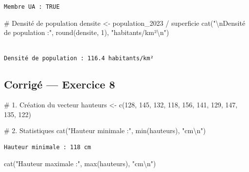 \documentclass[
  french,
  11pt,
  a4paper,
]{article}
\newenvironment{Shaded}{}{}
\newcommand{\CommentTok}[1]{\textcolor[rgb]{0.42,0.45,0.49}{#1}}
\newcommand{\DecValTok}[1]{\textcolor[rgb]{0.00,0.36,0.77}{#1}}
\newcommand{\FunctionTok}[1]{\textcolor[rgb]{0.44,0.26,0.76}{#1}}
\newcommand{\NormalTok}[1]{\textcolor[rgb]{0.14,0.16,0.18}{#1}}
\newcommand{\OtherTok}[1]{\textcolor[rgb]{0.44,0.26,0.76}{#1}}
\newcommand{\SpecialCharTok}[1]{\textcolor[rgb]{0.00,0.36,0.77}{#1}}
\newcommand{\StringTok}[1]{\textcolor[rgb]{0.01,0.18,0.38}{#1}}
\begin{document}
\begin{verbatim}
Membre UA : TRUE 
\end{verbatim}

\begin{Shaded}
\begin{Highlighting}[]
\CommentTok{\# Densité de population}
\NormalTok{densite }\OtherTok{\textless{}{-}}\NormalTok{ population\_2023 }\SpecialCharTok{/}\NormalTok{ superficie}
\FunctionTok{cat}\NormalTok{(}\StringTok{"}\SpecialCharTok{\textbackslash{}n}\StringTok{Densité de population :"}\NormalTok{, }\FunctionTok{round}\NormalTok{(densite, }\DecValTok{1}\NormalTok{), }\StringTok{"habitants/km²}\SpecialCharTok{\textbackslash{}n}\StringTok{"}\NormalTok{)}
\end{Highlighting}
\end{Shaded}

\begin{verbatim}

Densité de population : 116.4 habitants/km²
\end{verbatim}

\subsection{Corrigé --- Exercice 8}\label{corriguxe9-exercice-8}

\begin{Shaded}
\begin{Highlighting}[]
\CommentTok{\# 1. Création du vecteur}
\NormalTok{hauteurs }\OtherTok{\textless{}{-}} \FunctionTok{c}\NormalTok{(}\DecValTok{128}\NormalTok{, }\DecValTok{145}\NormalTok{, }\DecValTok{132}\NormalTok{, }\DecValTok{118}\NormalTok{, }\DecValTok{156}\NormalTok{, }\DecValTok{141}\NormalTok{, }\DecValTok{129}\NormalTok{, }\DecValTok{147}\NormalTok{, }\DecValTok{135}\NormalTok{, }\DecValTok{122}\NormalTok{)}

\CommentTok{\# 2. Statistiques}
\FunctionTok{cat}\NormalTok{(}\StringTok{"Hauteur minimale :"}\NormalTok{, }\FunctionTok{min}\NormalTok{(hauteurs), }\StringTok{"cm}\SpecialCharTok{\textbackslash{}n}\StringTok{"}\NormalTok{)}
\end{Highlighting}
\end{Shaded}

\begin{verbatim}
Hauteur minimale : 118 cm
\end{verbatim}

\begin{Shaded}
\begin{Highlighting}[]
\FunctionTok{cat}\NormalTok{(}\StringTok{"Hauteur maximale :"}\NormalTok{, }\FunctionTok{max}\NormalTok{(hauteurs), }\StringTok{"cm}\SpecialCharTok{\textbackslash{}n}\StringTok{"}\NormalTok{)}
\end{Highlighting}
\end{Shaded}
\end{document}
